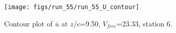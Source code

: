 \begin{figure}[H]
\centering
\texttt{[image: figs/run\_55/run\_55\_U\_contour]}
\caption{Contour plot of $\overline{u}$ at $z/c$=9.50, $V_{free}$=23.33, station 6.}
\label{fig:run_55_U_contour}
\end{figure}


